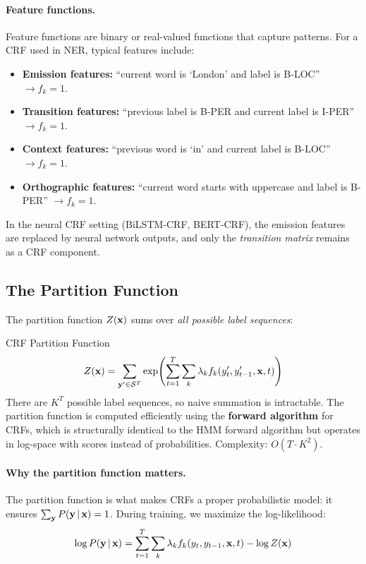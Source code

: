 \paragraph{Feature functions.}
Feature functions are binary or real-valued functions that capture patterns.
For a CRF used in NER, typical features include:

\begin{itemize}
    \item \textbf{Emission features:} ``current word is `London' and label is
          B-LOC'' $\to f_k = 1$.
    \item \textbf{Transition features:} ``previous label is B-PER and current
          label is I-PER'' $\to f_k = 1$.
    \item \textbf{Context features:} ``previous word is `in' and current label
          is B-LOC'' $\to f_k = 1$.
    \item \textbf{Orthographic features:} ``current word starts with uppercase
          and label is B-PER'' $\to f_k = 1$.
\end{itemize}

In the neural CRF setting (BiLSTM-CRF, BERT-CRF), the emission features are
replaced by neural network outputs, and only the \emph{transition matrix}
remains as a CRF component.

\subsection{The Partition Function}

The partition function $Z(\mathbf{x})$ sums over \emph{all possible label sequences}:

\begin{mathresult}{CRF Partition Function}
\begin{equation}
Z(\mathbf{x}) = \sum_{\mathbf{y}' \in \mathcal{S}^T}
\exp\!\left(\sum_{t=1}^{T} \sum_{k} \lambda_k f_k(y'_t, y'_{t-1}, \mathbf{x}, t)\right)
\label{eq:partition}
\end{equation}
There are $K^T$ possible label sequences, so naive summation is intractable.
The partition function is computed efficiently using the \textbf{forward
algorithm} for CRFs, which is structurally identical to the HMM forward
algorithm but operates in log-space with scores instead of probabilities.
Complexity: $O(T \cdot K^2)$.
\end{mathresult}

\paragraph{Why the partition function matters.}
The partition function is what makes CRFs a proper probabilistic model: it
ensures $\sum_{\mathbf{y}} P(\mathbf{y} \,|\, \mathbf{x}) = 1$.  During training, we maximize the
log-likelihood:
\begin{equation}
\log P(\mathbf{y} \,|\, \mathbf{x}) = \sum_{t=1}^{T} \sum_{k} \lambda_k f_k(y_t, y_{t-1}, \mathbf{x}, t) - \log Z(\mathbf{x})
\label{eq:crf_loglik}
\end{equation}

